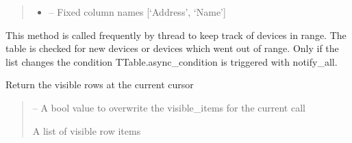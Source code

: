 \documentclass[letterpaper,10pt,english]{sphinxmanual}
\begin{document}
\begin{savenotes}
\begin{fulllineitems}
\begin{quote}
\begin{description}
\begin{itemize}
\item {} 
\sphinxAtStartPar
{} – Fixed column names {[}‘Address’, ‘Name’{]}

\end{itemize}

\end{description}\end{quote}

\begin{savenotes}\begin{fulllineitems}
\label{\detokenize{eezz:eezz.blueserv.TBluetooth.find_devices}}
\pysigstartsignatures
{}
\pysigstopsignatures
\sphinxAtStartPar
This method is called frequently by thread  to keep track of devices in range.
The table is checked for new devices or devices which went out of range. Only if the list changes the
condition TTable.async\_condition is triggered with notify\_all.

\end{fulllineitems}\end{savenotes}


\begin{savenotes}\begin{fulllineitems}
\label{\detokenize{eezz:eezz.blueserv.TBluetooth.get_visible_rows}}
\pysigstartsignatures
{}
\pysigstopsignatures
\sphinxAtStartPar
Return the visible rows at the current cursor
\begin{quote}\begin{description}
\sphinxAtStartPar
{} – A bool value to overwrite the visible\_items for the current call

\sphinxAtStartPar
A list of visible row items

\end{description}\end{quote}

\end{fulllineitems}\end{savenotes}


\end{fulllineitems}\end{savenotes}
\end{document}
